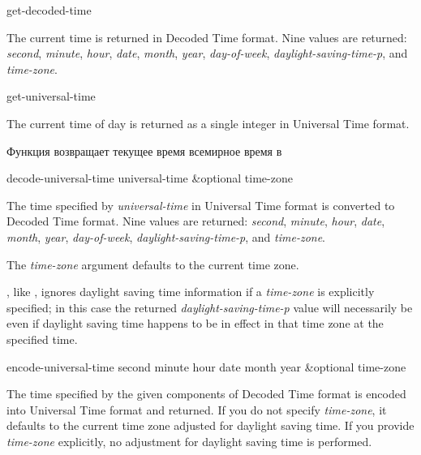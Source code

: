 \begin{defun}[Function]
get-decoded-time 

The current time is returned in Decoded Time format.  Nine values
are returned: \emph{second}, \emph{minute}, \emph{hour}, \emph{date}, \emph{month},
\emph{year}, \emph{day-of-week}, \emph{daylight-saving-time-p}, and \emph{time-zone}.
\end{defun}

\begin{defun}[Function]
get-universal-time 

The current time of day is returned as a single integer
in Universal Time format.

Функция возвращает текущее время всемирное время в 
\end{defun}

\begin{defun}[Function]
decode-universal-time universal-time &optional time-zone

The time specified by \emph{universal-time} in Universal Time format
is converted to Decoded Time format.  Nine values
are returned: \emph{second}, \emph{minute}, \emph{hour}, \emph{date}, \emph{month},
\emph{year}, \emph{day-of-week}, \emph{daylight-saving-time-p}, and \emph{time-zone}.

The \emph{time-zone} argument defaults to the current time zone.

,
like , ignores daylight saving time information
if a \emph{time-zone} is explicitly specified; in this case
the returned \emph{daylight-saving-time-p} value will necessarily be
 even if daylight saving time happens to be in effect in that
time zone at the specified time.
\end{defun}

\begin{defun}[Function]
encode-universal-time second minute hour date month year &optional time-zone

The time specified by the given components of Decoded Time format is
encoded into Universal Time format and returned.  If you do not specify
\emph{time-zone}, it defaults to the current time zone adjusted for daylight
saving time.  If you provide \emph{time-zone} explicitly, no adjustment for
daylight saving time is performed.

\end{defun}

